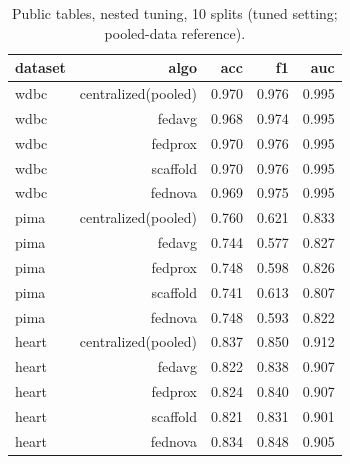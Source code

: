 \documentclass[conference]{IEEEtran}
\begin{document}
\begin{table}[t]\centering\caption{Public tables, nested tuning, 10 splits (tuned setting; pooled-data reference).}\label{t:real}\scriptsize
\begin{tabular}{lrrrr}\toprule
dataset & algo & acc & f1 & auc \\\midrule
wdbc & centralized(pooled) & 0.970 & 0.976 & 0.995 \\
wdbc & fedavg & 0.968 & 0.974 & 0.995 \\
wdbc & fedprox & 0.970 & 0.976 & 0.995 \\
wdbc & scaffold & 0.970 & 0.976 & 0.995 \\
wdbc & fednova & 0.969 & 0.975 & 0.995 \\
pima & centralized(pooled) & 0.760 & 0.621 & 0.833 \\
pima & fedavg & 0.744 & 0.577 & 0.827 \\
pima & fedprox & 0.748 & 0.598 & 0.826 \\
pima & scaffold & 0.741 & 0.613 & 0.807 \\
pima & fednova & 0.748 & 0.593 & 0.822 \\
heart & centralized(pooled) & 0.837 & 0.850 & 0.912 \\
heart & fedavg & 0.822 & 0.838 & 0.907 \\
heart & fedprox & 0.824 & 0.840 & 0.907 \\
heart & scaffold & 0.821 & 0.831 & 0.901 \\
heart & fednova & 0.834 & 0.848 & 0.905 \\\bottomrule\end{tabular}\end{table}
\end{document}
